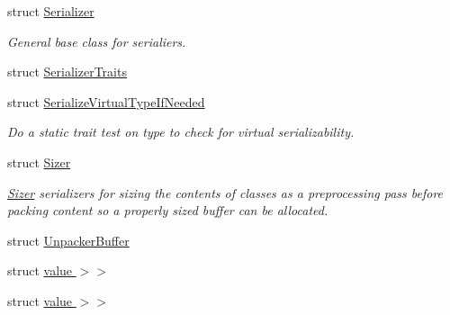 \begin{DoxyCompactItemize}
struct \hyperlink{structcheckpoint_1_1_serializer}{Serializer}
\begin{DoxyCompactList}\small\item\em General base class for serialiers. \end{DoxyCompactList}\item 
struct \hyperlink{structcheckpoint_1_1_serializer_traits}{Serializer\+Traits}
\item 
struct \hyperlink{structcheckpoint_1_1_serialize_virtual_type_if_needed}{Serialize\+Virtual\+Type\+If\+Needed}
\begin{DoxyCompactList}\small\item\em Do a static trait test on type to check for virtual serializability. \end{DoxyCompactList}\item 
struct \hyperlink{structcheckpoint_1_1_sizer}{Sizer}
\begin{DoxyCompactList}\small\item\em \hyperlink{structcheckpoint_1_1_sizer}{Sizer} serializers for sizing the contents of classes as a preprocessing pass before packing content so a properly sized buffer can be allocated. \end{DoxyCompactList}\item 
struct \hyperlink{structcheckpoint_1_1_unpacker_buffer}{Unpacker\+Buffer}
\item 
struct \hyperlink{structcheckpoint_1_1_reconstruct_as_virtual_if_needed_3_01_t_00_01_serializer_t_00_01typename_01bd353309780a1641c6b4da6107e9b732}{value $>$$>$}
\item 
struct \hyperlink{structcheckpoint_1_1_reconstruct_as_virtual_if_needed_3_01_t_00_01_serializer_t_00_01typename_0185cb3961b0806c240679cf17dd651016}{value $>$$>$}
\end{DoxyCompactItemize}
